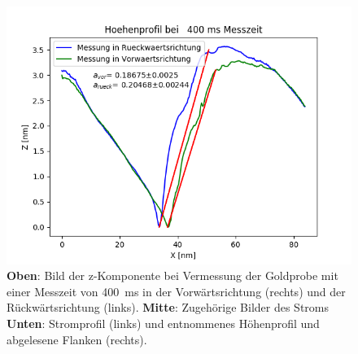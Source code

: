 \documentclass[12pt,a4paper]{article}
\begin{document}
\begin{figure}[H]
\includegraphics[scale=0.5]{Bilder/Anhang/Zeit/Profil_Zeit_400.png}
\caption{\textbf{Oben}: Bild der z-Komponente bei Vermessung der Goldprobe mit einer Messzeit von \SI{400}{ms} in der Vorwärtsrichtung (rechts) und der Rückwärtsrichtung (links). \textbf{Mitte}: Zugehörige Bilder des Stroms \textbf{Unten}: Stromprofil (links) und entnommenes Höhenprofil und abgelesene Flanken (rechts).}
\end{figure}
\end{document}
